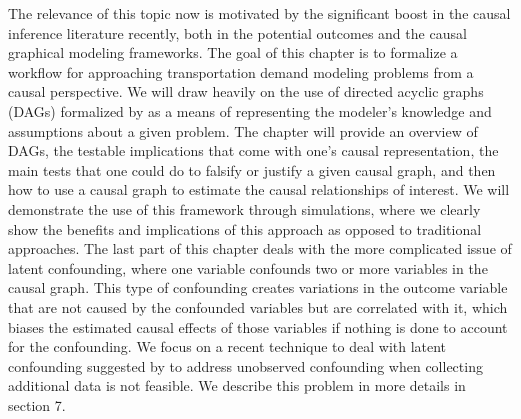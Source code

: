 The relevance of this topic now is motivated by the significant boost in the causal inference literature recently, both in the potential outcomes and the causal graphical modeling frameworks.
The goal of this chapter is to formalize a workflow for approaching 
transportation demand modeling problems from a causal perspective. 
We will draw heavily on the use of directed acyclic graphs (DAGs) formalized by \citet{pearl_causality_2000} as a means of representing the modeler's knowledge and assumptions about a given problem. 
The chapter will provide an overview of DAGs, the 
testable implications that come with one's causal representation, the main 
tests that one could do to falsify or justify a given causal graph, and then how 
to use a causal graph to estimate the causal relationships of interest. 
We will demonstrate the use of this framework through simulations, where we 
clearly show the benefits and implications of this approach as opposed to 
traditional approaches. 
The last part of this chapter deals with the more complicated issue of latent 
confounding, where one variable confounds two or more variables in the causal 
graph. This type of confounding creates variations in the outcome variable that are not caused by 
the confounded variables but are correlated with it, which biases the estimated 
causal effects of those variables if nothing is done to account for the 
confounding. 
We focus on a recent technique to deal with latent confounding suggested by \citet{wang_2019_blessings} to address unobserved confounding when collecting additional data is not feasible. 
We describe this problem in more details in section 7.
